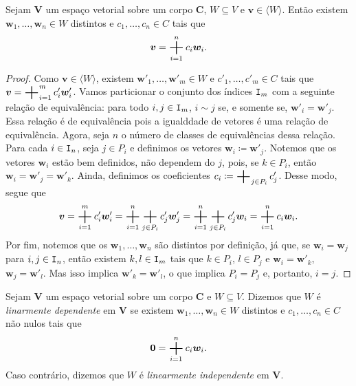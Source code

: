\begin{prop}
	Sejam $\bm V$ um espaço vetorial sobre um corpo $\bm C$, $W \subseteq V$ e $\bm v \in \langle W \rangle$. Então existem $\bm w_1, \ldots, \bm w_n \in W$ distintos e $c_1, \ldots, c_n \in C$ tais que
	\begin{equation*}
	\bm v = \bigsum_{i=1}^n c_i \bm w_i.
	\end{equation*}
\end{prop}
\begin{proof}
	Como $\bm v \in \langle W \rangle$, existem $\bm w'_1, \ldots, \bm w'_m \in W$ e $c'_1, \ldots, c'_m \in C$ tais que $\bm v = \bigsum_{i=1}^m c'_i \bm w'_i$. Vamos particionar o conjunto dos índices $\mathtt I_m$ com a seguinte relação de equivalência: para todo $i,j \in \mathtt I_m$, $i \sim j$ se, e somente se, $\bm w'_i = \bm w'_j$. Essa relação é de equivalência pois a igualddade de vetores é uma relação de equivalência. Agora, seja $n$ o número de classes de equivalências dessa relação. Para cada $i \in \mathtt I_n$, seja $j \in P_i$ e definimos os vetores $\bm w_i \coloneqq \bm w'_j$. Notemos que os vetores $\bm w_i$ estão bem definidos, não dependem do $j$, pois, se $k \in P_i$, então $\bm w_i = \bm w'_j = \bm w'_k$. Ainda, definimos os coeficientes $c_i \coloneqq \bigsum _{j \in P_i} c'_j$. Desse modo, segue que
	\begin{equation*}
	\bm v = \bigsum_{i=1}^m c'_i \bm w'_i = \bigsum_{i=1}^n \bigsum_{j \in P_i} c'_j \bm w'_j = \bigsum_{i=1}^n \bigsum_{j \in P_i} c'_j \bm w_i =  \bigsum_{i=1}^n c_i \bm w_i.
	\end{equation*}
	Por fim, notemos que os $\bm w_1, \ldots, \bm w_n$ são distintos por definição, já que, se $\bm w_i = \bm w_j$ para $i,j \in \mathtt I_n$, então existem $k,l \in \mathtt I_m$ tais que $k \in P_i$, $l \in P_j$ e $\bm w_i = \bm w'_k$, $\bm w_j = \bm w'_l$. Mas isso implica $\bm w'_k=\bm w'_l$, o que implica $P_i = P_j$ e, portanto, $i = j$.
\end{proof}

\begin{defi}
	Sejam $\bm V$ um espaço vetorial sobre um corpo $\bm C$ e $W \subseteq V$. Dizemos que $W$ é \emph{linarmente dependente} em $\bm V$ se existem $\bm w_1, \ldots,\bm w_n \in W$ distintos e $c_1,\ldots,c_n \in C$ não nulos tais que
	\begin{equation*}
	\bm 0 = \bigsum_{i=1}^n c_i \bm w_i.
	\end{equation*}
Caso contrário, dizemos que $W$ é \emph{linearmente independente} em $\bm V$.
\end{defi}

